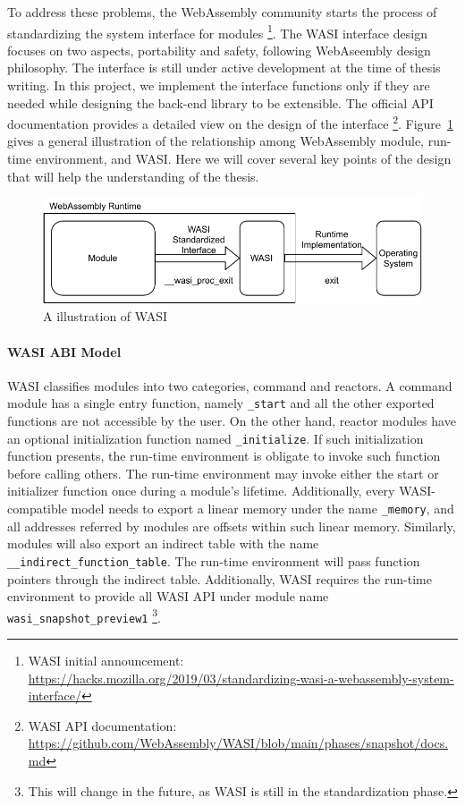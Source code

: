 To address these problems, the WebAssembly community starts the process of standardizing the system interface for modules \footnote{WASI initial announcement: \\\url{https://hacks.mozilla.org/2019/03/standardizing-wasi-a-webassembly-system-interface/}}. The WASI interface design focuses on two aspects, portability and safety, following WebAseembly design philosophy. The interface is still under active development at the time of thesis writing. In this project, we implement the interface functions only if they are needed while designing the back-end library to be extensible.  The official API documentation provides a detailed view on the design of the interface \footnote{WASI API documentation: \\\url{https://github.com/WebAssembly/WASI/blob/main/phases/snapshot/docs.md}}. Figure~\ref{fig:wasi-intro} gives a general illustration of the relationship among WebAssembly module, run-time environment, and WASI.  Here we will cover several key points of the design that will help the understanding of the thesis.

\begin{figure}
  \centering
  \includegraphics{Images/wasi-intro.pdf}
  \caption{A illustration of WASI}
  \label{fig:wasi-intro}
\end{figure}

\paragraph{WASI ABI Model}
WASI classifies modules into two categories, command and reactors. A command module has a single entry function, namely \texttt{\_start} and all the other exported functions are not accessible by the user. On the other hand, reactor modules have an optional initialization function named \texttt{\_initialize}. If such initialization function presents, the run-time environment is obligate to invoke such function before calling others. The run-time environment may invoke either the start or initializer function once during a module's lifetime. Additionally, every WASI-compatible model needs to export a linear memory under the name \texttt{\_memory}, and all addresses referred by modules are offsets within such linear memory. Similarly, modules will also export an indirect table with the name \texttt{\_\_indirect\_function\_table}. The run-time environment will pass function pointers through the indirect table. Additionally, WASI requires the run-time environment to provide all WASI API under module name \texttt{wasi\_snapshot\_preview1} \footnote{This will change in the future, as WASI is still in the standardization phase.}.


